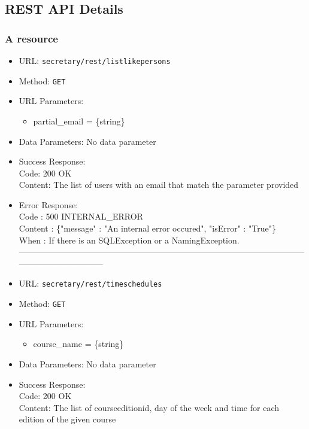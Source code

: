 \subsection{REST API Details}


\subsubsection*{A resource}


\begin{itemize}
    \item URL: \texttt{secretary/rest/listlikepersons}
    \item Method: \texttt{GET}
    \item URL Parameters:
    	\begin{itemize}
    		\item partial\_email = \{string\}    		
    	\end{itemize}
    \item Data Parameters: No data parameter
    \item Success Response:\\
    Code: 200 OK\\
    Content: The list of users with an email that match the parameter provided
    \item Error Response:\\
    Code : 500 INTERNAL\_ERROR\\
    Content : \{"message" : "An internal error occured", "isError" : "True"\}\\
    When : If there is an SQLException or a NamingException.\\
------------------------------------------------------------------------------------------------------------------------------------
    \item URL: \texttt{secretary/rest/timeschedules}
    \item Method: \texttt{GET}
    \item URL Parameters:
    \begin{itemize}
    	\item course\_name = \{string\}    		
    \end{itemize}
    \item Data Parameters: No data parameter
    \item Success Response:\\
    Code: 200 OK\\
    Content: The  list of courseeditionid, day of the week and time for each edition of the given course        

\end{itemize}
